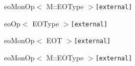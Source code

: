 \begin{CompactList}
\begin{CompactList}
\begin{CompactList}
\item eo\-Mon\-Op$<$ M::EOType $>${\tt  [external]}\begin{CompactList}
\item {}
\begin{CompactList}
\item {}
\item {}
\item {}
\end{CompactList}
\end{CompactList}
\end{CompactList}
\end{CompactList}
\item eo\-Op$<$ EOType $>${\tt  [external]}\begin{CompactList}
\item eo\-Mon\-Op$<$ EOT $>${\tt  [external]}\item eo\-Mon\-Op$<$ M::EOType $>${\tt  [external]}\end{CompactList}
\end{CompactList}
